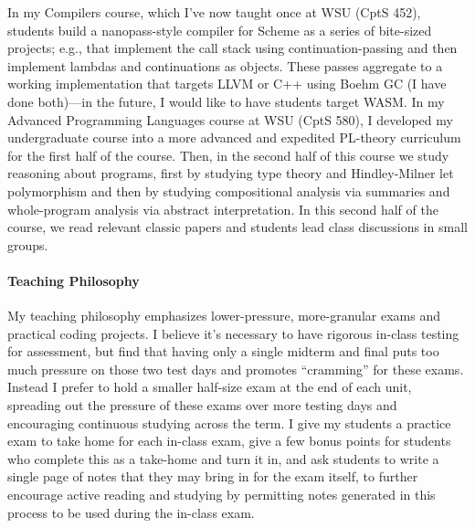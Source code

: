 \documentclass[12pt]{article}
\begin{document}
In my Compilers course, which I've now taught once at WSU (CptS 452), students build a nanopass-style compiler for Scheme as a series of bite-sized projects; e.g., that implement the call stack using continuation-passing and then implement lambdas and continuations as objects. These passes aggregate to a working implementation that targets LLVM or C++ using Boehm GC (I have done both)---in the future, I would like to have students target WASM. In my Advanced Programming Languages course at WSU (CptS 580), I developed my undergraduate course into a more advanced and expedited PL-theory curriculum for the first half of the course. Then, in the second half of this course we study reasoning about programs, first by studying type theory and Hindley-Milner let polymorphism and then by studying compositional analysis via summaries and whole-program analysis via abstract interpretation. In this second half of the course, we read relevant classic papers and students lead class discussions in small groups.

\paragraph{Teaching Philosophy}

My teaching philosophy emphasizes lower-pressure, more-granular exams and practical coding projects. I believe it's necessary to have rigorous in-class testing for assessment, but find that having only a single midterm and final puts too much pressure on those two test days and promotes ``cramming'' for these exams. Instead I prefer to hold a smaller half-size exam at the end of each unit, spreading out the pressure of these exams over more testing days and encouraging continuous studying across the term. I give my students a practice exam to take home for each in-class exam, give a few bonus points for students who complete this as a take-home and turn it in, and ask students to write a single page of notes that they may bring in for the exam itself, to further encourage active reading and studying by permitting notes generated in this process to be used during the in-class exam.
\end{document}
